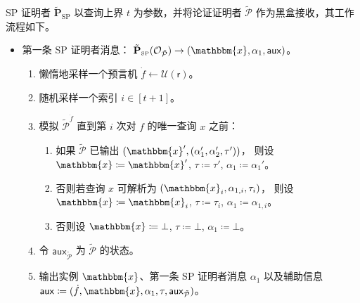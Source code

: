 \documentclass[american,singlepageview]{snargs-book-zh}
\newcommand{\Malicious}[1]{\tilde{#1}}
\newcommand{\DefineEqual}{\coloneqq}
\newcommand{\AuxiliaryState}{\mathsf{aux}}
\newcommand{\BlackBox}[1]{\mathcal{O}_{#1}}
\newcommand{\Instance}{\mathbbm{x}}
\newcommand{\ProtoProver}{P}
\newcommand{\ProtoSalt}{\tau}
\newcommand{\ProtoRandomnessComplexity}{\mathsf{r}}
\newcommand{\SPSubscript}{\scriptscriptstyle\mathrm{SP}}
\newcommand{\SPFormat}[1]{\mathbf{#1}}
\newcommand{\SPMaliciousProver}{\Malicious{\SPFormat{\ProtoProver}}_{\SPSubscript}}
\newcommand{\SPCommitment}{\alpha_{1}}
\newcommand{\SPCommitmentIndexed}[1]{\alpha_{1,#1}}
\newcommand{\SPResponse}{\alpha_{2}}
\newcommand{\SPRandomnessComplexity}{\ProtoRandomnessComplexity}
\newcommand{\ARGFormat}[1]{\mathcal{#1}}
\newcommand{\ARGProver}{\ARGFormat{\ProtoProver}}
\newcommand{\ROFunction}{f}
\newcommand{\ROQueryBound}{t}
\newcommand{\RODistribution}[1]{\mathcal{U}(#1)}
\newcommand{\ROQuery}{x}
\newcommand{\Lazy}[1]{\dot{#1}}
\newcommand{\RandSaltString}{\ProtoSalt}
\begin{document}
\begin{construction}
\label{construction:fs-for-sigma-protocols-adaptive}
SP 证明者 $\SPMaliciousProver$ 以查询上界 $\ROQueryBound$ 为参数，并将论证证明者 $\Malicious{\ARGProver}$ 作为黑盒接收，其工作流程如下。

\begin{itemize}[noitemsep]
  \item 第一条 SP 证明者消息：
    \(\SPMaliciousProver(\BlackBox{\Malicious{\ARGProver}}) \to (\Instance,\SPCommitment,\AuxiliaryState)\)。
  \begin{enumerate}[noitemsep]
    \item 懒惰地采样一个预言机
      \(\Lazy{\ROFunction} \gets \RODistribution{\SPRandomnessComplexity}\)。
    \item 随机采样一个索引
      \(i \in [\ROQueryBound+1]\)。
    \item 模拟
      \(\Malicious{\ARGProver}^{\Lazy{\ROFunction}}\)
      直到第 \(i\) 次对 \(\ROFunction\) 的唯一查询 \(\ROQuery\) 之前：
      \begin{enumerate}[noitemsep]
        \item 如果 \(\Malicious{\ARGProver}\) 已输出
          \((\Instance',(\SPCommitment',\SPResponse',\RandSaltString'))\)，
          则设
          \(\Instance \DefineEqual \Instance'\), 
          \(\RandSaltString \DefineEqual \RandSaltString'\),
          \(\SPCommitment \DefineEqual \SPCommitment'\)。
        \item 否则若查询 \(\ROQuery\) 可解析为
          \((\Instance_{i},\SPCommitmentIndexed{i},\RandSaltString_{i})\)，
          则设
          \(\Instance \DefineEqual \Instance_{i}\),
          \(\RandSaltString \DefineEqual \RandSaltString_{i}\),
          \(\SPCommitment \DefineEqual \SPCommitmentIndexed{i}\)。
        \item 否则设
          \(\Instance \DefineEqual \bot\),
          \(\RandSaltString \DefineEqual \bot\),
          \(\SPCommitment \DefineEqual \bot\)。
      \end{enumerate}
    \item 令
      \(\AuxiliaryState_{\Malicious{\ARGProver}}\)
      为 \(\Malicious{\ARGProver}\) 的状态。
    \item 输出实例 \(\Instance\)、第一条 SP 证明者消息 \(\SPCommitment\) 以及辅助信息
      \(\AuxiliaryState \DefineEqual (\Lazy{\ROFunction},\Instance,\SPCommitment,\RandSaltString,\AuxiliaryState_{\Malicious{\ARGProver}})\)。
  \end{enumerate}


\end{itemize}
\end{construction}
\end{document}
